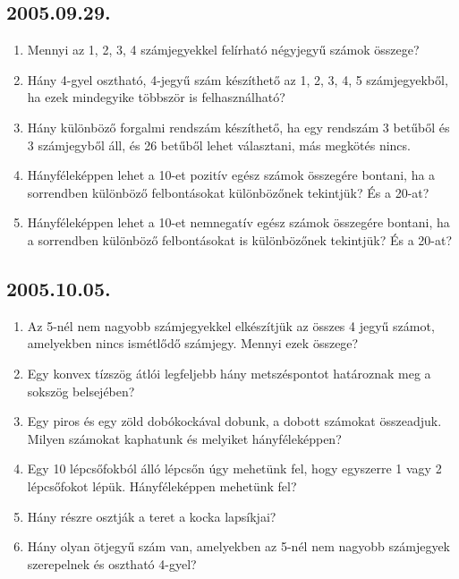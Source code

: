 \documentclass{article}
\begin{document}
\subsection*{2005.09.29.}
\begin{enumerate}
\item Mennyi az 1, 2, 3, 4 számjegyekkel felírható négyjegyű számok összege?

\item Hány 4-gyel osztható, 4-jegyű szám készíthető az 1, 2, 3, 4, 5 számjegyekből, ha ezek mindegyike többször is felhasználható?

\item Hány különböző forgalmi rendszám készíthető, ha egy rendszám 3 betűből és 3 számjegyből áll, és 26 betűből lehet választani, más megkötés nincs.

\item Hányféleképpen lehet a 10-et pozitív egész számok összegére bontani, ha a sorrendben különböző felbontásokat különbözőnek tekintjük? És a 20-at?

\item Hányféleképpen lehet a 10-et nemnegatív egész számok összegére bontani, ha a sorrendben különböző felbontásokat is különbözőnek tekintjük? És a 20-at?
\end{enumerate}


\subsection*{2005.10.05.}
\begin{enumerate}
\item Az 5-nél nem nagyobb számjegyekkel elkészítjük az összes 4 jegyű számot, amelyekben nincs ismétlődő számjegy. Mennyi ezek összege?

\item Egy konvex tízszög átlói legfeljebb hány metszéspontot határoznak meg a sokszög belsejében?

\item Egy piros és egy zöld dobókockával dobunk, a dobott számokat összeadjuk. Milyen számokat kaphatunk és melyiket hányféleképpen?

\item Egy 10 lépcsőfokból álló lépcsőn úgy mehetünk fel, hogy egyszerre 1 vagy 2 lépcsőfokot lépük. Hányféleképpen mehetünk fel?

\item Hány részre osztják a teret a kocka lapsíkjai?

\item Hány olyan ötjegyű szám van, amelyekben az 5-nél nem nagyobb számjegyek szerepelnek és osztható 4-gyel?
\end{enumerate}
\end{document}

